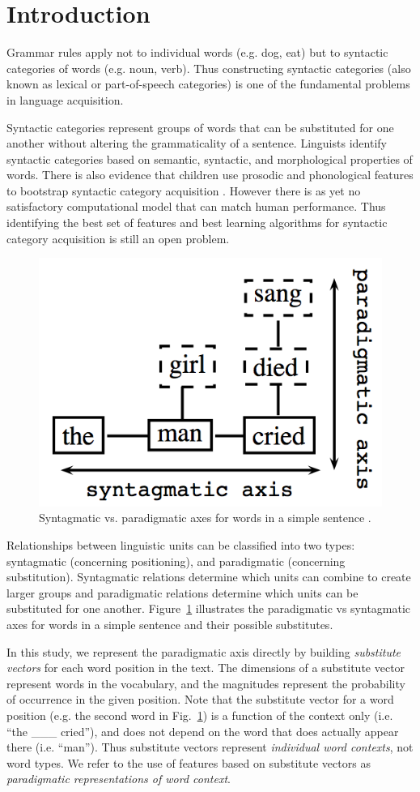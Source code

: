 \section{Introduction}
\label{sec:intro}

Grammar rules apply not to individual words (e.g. dog, eat) but to
syntactic categories of words (e.g. noun, verb).  Thus constructing
syntactic categories (also known as lexical or part-of-speech
categories) is one of the fundamental problems in language
acquisition.

Syntactic categories represent groups of words that can be substituted
for one another without altering the grammaticality of a sentence.
Linguists identify syntactic categories based on semantic, syntactic,
and morphological properties of words.  There is also evidence that
children use prosodic and phonological features to bootstrap syntactic
category acquisition \cite{ambridge2011child}.  However there is as
yet no satisfactory computational model that can match human
performance.  Thus identifying the best set of features and best
learning algorithms for syntactic category acquisition is still an
open problem.

\begin{figure}[t] 
  \centering
  \includegraphics[height=0.3\textwidth]{paradigmatic.png}
  \caption{Syntagmatic vs. paradigmatic axes for words in a simple
    sentence \protect\cite{chandler2007semiotics}.}
  \label{fig:paradigmatic}
\end{figure}

Relationships between linguistic units can be classified into two
types: syntagmatic (concerning positioning), and paradigmatic
(concerning substitution).  Syntagmatic relations determine which
units can combine to create larger groups and paradigmatic relations
determine which units can be substituted for one another.
Figure~\ref{fig:paradigmatic} illustrates the paradigmatic vs
syntagmatic axes for words in a simple sentence and their possible
substitutes.  

In this study, we represent the paradigmatic axis directly by building
{\em substitute vectors} for each word position in the text.  The
dimensions of a substitute vector represent words in the vocabulary,
and the magnitudes represent the probability of occurrence in the given
position.  Note that the substitute vector for a word position (e.g.
the second word in Fig.~\ref{fig:paradigmatic}) is a function of the
context only (i.e. ``the \_\_\_ cried''), and does not depend on the
word that does actually appear there (i.e. ``man'').  Thus substitute
vectors represent {\em individual word contexts}, not word types.  We
refer to the use of features based on substitute vectors as 
{\em paradigmatic representations of word context}.

